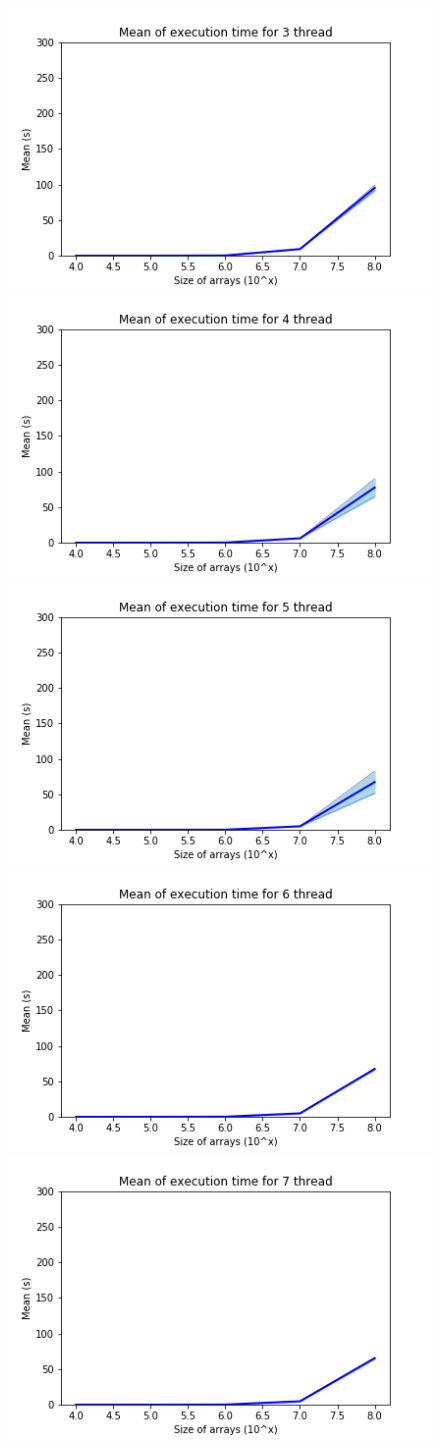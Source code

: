 \documentclass[a4paper,12pt]{article}
\begin{document}
    \begin{figure}[ht]
         \includegraphics[width = 0.45\linewidth]{Mean of execution time for 3 thread.png}
        \includegraphics[width = 0.45\linewidth]{Mean of execution time for 4 thread.png}
        \includegraphics[width = 0.45\linewidth]{Mean of execution time for 5 thread.png}
        \includegraphics[width = 0.45\linewidth]{Mean of execution time for 6 thread.png}
        \includegraphics[width = 0.45\linewidth]{Mean of execution time for 7 thread.png}

\end{figure}
\end{document}
